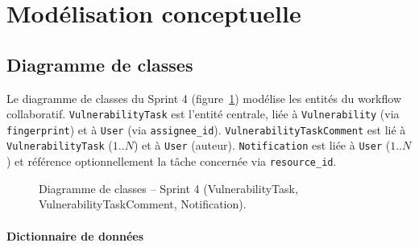 \section{Modélisation conceptuelle}

\subsection{Diagramme de classes}

Le diagramme de classes du Sprint 4 (figure~\ref{fig:sprint4-class}) modélise les entités du workflow collaboratif. \texttt{VulnerabilityTask} est l'entité centrale, liée à \texttt{Vulnerability} (via \texttt{fingerprint}) et à \texttt{User} (via \texttt{assignee\_id}). \texttt{VulnerabilityTaskComment} est lié à \texttt{VulnerabilityTask} (\(1..N\)) et à \texttt{User} (auteur). \texttt{Notification} est liée à \texttt{User} (\(1..N\)) et référence optionnellement la tâche concernée via \texttt{resource\_id}.

\begin{figure}[H]
\centering
\fbox{\rule{0pt}{2in}\rule{0.9\linewidth}{0pt}}
\caption{Diagramme de classes -- Sprint 4 (VulnerabilityTask, VulnerabilityTaskComment, Notification).}
\label{fig:sprint4-class}
\end{figure}

\paragraph{Dictionnaire de données}

